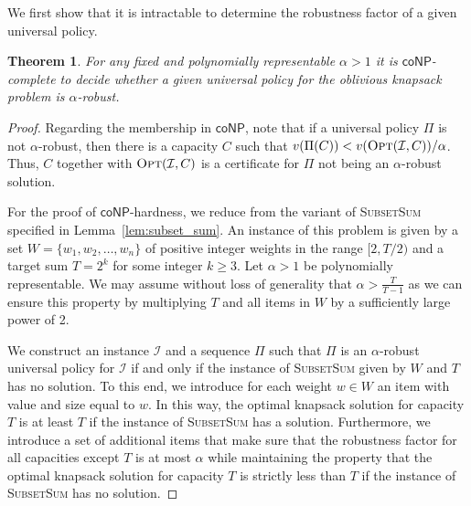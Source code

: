\documentclass[11pt]{article}
\newtheorem{theorem}{Theorem}
\newcommand{\opt}{\textsc{Opt}}
\newcommand{\OPT}{\opt}
\newcommand{\I}{\mathcal{I}}
\newcommand{\classcoNP}{\mathsf{coNP}}
\begin{document}
We first show that it is intractable to determine the robustness factor
of a given universal policy.
\begin{theorem}
\label{thm:hardness} For any fixed and polynomially representable
$\alpha>1$ it is $\classcoNP$-complete to decide whether a given
universal policy for the oblivious knapsack problem is $\alpha$-robust.\end{theorem}
\begin{proof}
Regarding the membership in $\classcoNP$, note that if a universal
policy $\Pi$ is not $\alpha$-robust, then there is a capacity $C$
such that $v(\Pi(C))<v(\OPT(\I,C))/\alpha$. Thus, $C$ together with
$\OPT(\I,C)$ is a certificate for $\Pi$ not being an $\alpha$-robust
solution. 

For the proof of $\classcoNP$-hardness, we reduce from the variant
of \textsc{SubsetSum} specified in Lemma~\ref{lem:subset_sum}. An
instance of this problem is given by a set $W=\{w_{1},w_{2},\dots,w_{n}\}$
of positive integer weights in the range $[2,T/2)$ and a target sum
$T=2^{k}$ for some integer $k\geq3$. Let $\alpha>1$ be polynomially
representable. We may assume without loss of generality that $\alpha>\frac{T}{T-1}$
as we can ensure this property by multiplying $T$ and all items in
$W$ by a sufficiently large power of 2.

We construct an instance $\I$ and a sequence $\Pi$ such that $\Pi$
is an $\alpha$-robust universal policy for $\mathcal{I}$ if and
only if the instance of \textsc{SubsetSum} given by $W$ and $T$
has no solution. To this end, we introduce for each weight $w\in W$
an item with value and size equal to $w$. In this way, the optimal
knapsack solution for capacity $T$ is at least $T$ if the instance
of \textsc{SubsetSum} has a solution. Furthermore, we introduce a
set of additional items that make sure that the robustness factor
for all capacities except $T$ is at most $\alpha$ while maintaining
the property that the optimal knapsack solution for capacity $T$
is strictly less than $T$ if the instance of \textsc{SubsetSum} has
no solution.


\end{proof}
\end{document}
